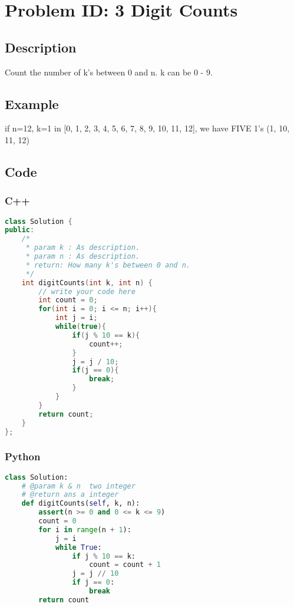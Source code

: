 \section{Problem ID: 3 Digit Counts}
\subsection{Description}
Count the number of k's between 0 and n. k can be 0 - 9.

\subsection{Example}
if n=12, k=1 in [0, 1, 2, 3, 4, 5, 6, 7, 8, 9, 10, 11, 12], we have FIVE 1's (1, 10, 11, 12)

\subsection{Code}
\scriptsize
\subsubsection{C++}
\begin{lstlisting}[language=C++]
class Solution {
public:
    /*
     * param k : As description.
     * param n : As description.
     * return: How many k's between 0 and n.
     */
    int digitCounts(int k, int n) {
        // write your code here
        int count = 0;
        for(int i = 0; i <= n; i++){
            int j = i;
            while(true){
                if(j % 10 == k){
                    count++;
                }
                j = j / 10;
                if(j == 0){
                    break;
                }
            }
        }
        return count;
    }
};
\end{lstlisting}

\subsubsection{Python}
\begin{lstlisting}[language=Python]
class Solution:
    # @param k & n  two integer
    # @return ans a integer
    def digitCounts(self, k, n):
        assert(n >= 0 and 0 <= k <= 9)
        count = 0
        for i in range(n + 1):
            j = i
            while True:
                if j % 10 == k:
                    count = count + 1
                j = j // 10
                if j == 0:
                    break
        return count
\end{lstlisting}
\normalsize 